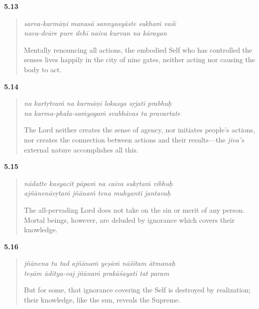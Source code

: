 \par\noindent\textbf{5.13}\par
\begin{verse}
\textit{sarva-karmāṇi manasā sannyasyāste sukhaṁ vaśī} \\
\textit{nava-dvāre pure dehī naiva kurvan na kārayan}

\noindent Mentally renouncing all actions, the embodied Self who has controlled the senses lives happily in the city of nine gates, neither acting nor causing the body to act.
\end{verse}
\par



\par\noindent\textbf{5.14}\par
\begin{verse}
\textit{na kartṛtvaṁ na karmāṇi lokasya sṛjati prabhuḥ} \\
\textit{na karma-phala-saṁyogaṁ svabhāvas tu pravartate}

\noindent The Lord neither creates the sense of agency, nor initiates people’s actions, nor creates the connection between actions and their results---the \textit{jīva's} external nature accomplishes all this.
\end{verse}
\par



\par\noindent\textbf{5.15}\par
\begin{verse}
\textit{nādatte kasyacit pāpaṁ na caiva sukṛtaṁ vibhuḥ} \\
\textit{ajñānenāvṛtaṁ jñānaṁ tena muhyanti jantavaḥ}

\noindent The all-pervading Lord does not take on the sin or merit of any person. Mortal beings, however, are deluded by ignorance which covers their knowledge.
\end{verse}
\par



\par\noindent\textbf{5.16}\par
\begin{verse}
\textit{jñānena tu tad ajñānaṁ yeṣāṁ nāśitam ātmanaḥ} \\
\textit{teṣām āditya-vaj jñānaṁ prakāśayati tat param}

\noindent But for some, that ignorance covering the Self is destroyed by realization; their knowledge, like the sun, reveals the Supreme.
\end{verse}
\par



